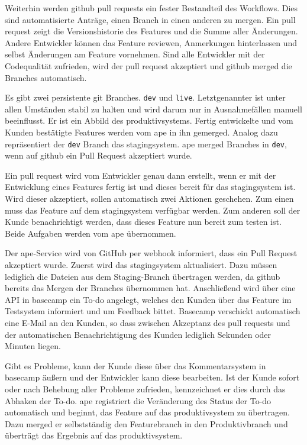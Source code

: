Weiterhin werden \gls{github} \glspl{pull request} ein fester Bestandteil des Workflows. Dies sind automatisierte Anträge, einen Branch in einen anderen zu mergen. Ein \gls{pull request} zeigt die Versionshistorie des Features und die Summe aller Änderungen. Andere Entwickler können das Feature reviewen, Anmerkungen hinterlassen und selbst Änderungen am Feature vornehmen. Sind alle Entwickler mit der Codequalität zufrieden, wird der \gls{pull request} akzeptiert und \gls{github} merged die Branches automatisch.

Es gibt zwei persistente \gls{git} Branches. \lstinline!dev! und \lstinline!live!. Letztgenannter ist unter allen Umständen stabil zu halten und wird darum nur in Ausnahmefällen manuell beeinflusst. Er ist ein Abbild des \gls{produktivsystem}s. Fertig entwickelte und vom Kunden bestätigte Features werden vom \gls{ape} in ihn gemerged. Analog dazu repräsentiert der \lstinline!dev! Branch das \gls{stagingsystem}. \gls{ape} merged Branches in \lstinline!dev!, wenn auf \gls{github} ein Pull Request akzeptiert wurde.

Ein \gls{pull request} wird vom Entwickler genau dann erstellt, wenn er mit der Entwicklung eines Features fertig ist und dieses bereit für das \gls{stagingsystem} ist. Wird dieser akzeptiert, sollen automatisch zwei Aktionen geschehen. Zum einen muss das Feature auf dem \gls{stagingsystem} verfügbar werden. Zum anderen soll der Kunde benachrichtigt werden, dass dieses Feature nun bereit zum testen ist. Beide Aufgaben werden vom \gls{ape} übernommen.

Der \gls{ape}-Service wird von GitHub per \Gls{webhook} informiert, dass ein Pull Request akzeptiert wurde. Zuerst wird das \gls{stagingsystem} aktualisiert. Dazu müssen lediglich die Dateien aus dem Staging-Branch übertragen werden, da \gls{github} bereits das Mergen der Branches übernommen hat. Anschließend wird über eine API in \gls{basecamp} ein To-do angelegt, welches den Kunden über das Feature im Testsystem informiert und um Feedback bittet. Basecamp verschickt automatisch eine E-Mail an den Kunden, so dass zwischen Akzeptanz des \glspl{pull request} und der automatischen Benachrichtigung des Kunden lediglich Sekunden oder Minuten liegen.

Gibt es Probleme, kann der Kunde diese über das Kommentarsystem in \gls{basecamp} äußern und der Entwickler kann diese bearbeiten. Ist der Kunde sofort oder nach Behebung aller Probleme zufrieden, kennzeichnet er dies durch das Abhaken der To-do. \gls{ape} registriert die Veränderung des Status der To-do automatisch und beginnt, das Feature auf das \gls{produktivsystem} zu übertragen. Dazu merged er selbstständig den Featurebranch in den Produktivbranch und überträgt das Ergebnis auf das \gls{produktivsystem}.

